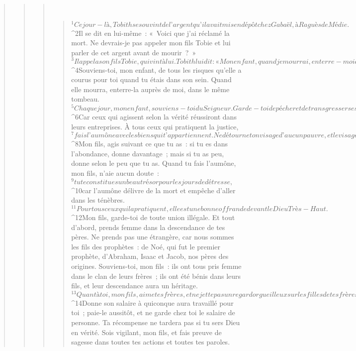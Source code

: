 \begin{verse}
\begin{verse}
\begin{verse}
         
      \bchapter{}
      \begin{verse}
${}^{1}Ce jour-là, Tobith se souvint de l’argent qu’il avait mis en dépôt chez Gabaël, à Raguès de Médie. 
${}^{2}Il se dit en lui-même : « Voici que j’ai réclamé la mort. Ne devrais-je pas appeler mon fils Tobie et lui parler de cet argent avant de mourir ? » 
${}^{3}Il appela son fils Tobie, qui vint à lui. Tobith lui dit : « Mon enfant, quand je mourrai, enterre-moi dignement. Honore ta mère et ne l’abandonne pas aussi longtemps qu’elle vivra. Fais ce qui lui est agréable et ne l’attriste en rien. 
${}^{4}Souviens-toi, mon enfant, de tous les risques qu’elle a courus pour toi quand tu étais dans son sein. Quand elle mourra, enterre-la auprès de moi, dans le même tombeau. 
${}^{5}Chaque jour, mon enfant, souviens-toi du Seigneur. Garde-toi de pécher et de transgresser ses commandements. Fais ce qui est juste tous les jours de ta vie et ne marche pas dans les voies de l’injustice. 
${}^{6}Car ceux qui agissent selon la vérité réussiront dans leurs entreprises. À tous ceux qui pratiquent la justice, 
${}^{7}fais l’aumône avec les biens qui t’appartiennent. Ne détourne ton visage d’aucun pauvre, et le visage de Dieu ne se détournera pas de toi.
${}^{8}Mon fils, agis suivant ce que tu as : si tu es dans l’abondance, donne davantage ; mais si tu as peu, donne selon le peu que tu as. Quand tu fais l’aumône, mon fils, n’aie aucun doute : 
${}^{9}tu te constitues un beau trésor pour les jours de détresse, 
${}^{10}car l’aumône délivre de la mort et empêche d’aller dans les ténèbres. 
${}^{11}Pour tous ceux qui la pratiquent, elle est une bonne offrande devant le Dieu Très-Haut. 
${}^{12}Mon fils, garde-toi de toute union illégale. Et tout d’abord, prends femme dans la descendance de tes pères. Ne prends pas une étrangère, car nous sommes les fils des prophètes : de Noé, qui fut le premier prophète, d’Abraham, Isaac et Jacob, nos pères des origines. Souviens-toi, mon fils : ils ont tous pris femme dans le clan de leurs frères ; ils ont été bénis dans leurs fils, et leur descendance aura un héritage. 
${}^{13}Quant à toi, mon fils, aime tes frères, et ne jette pas un regard orgueilleux sur les filles de tes frères. Car, dans l’orgueil, il y a ruine et grand désordre et, dans une conduite indigne, abaissement et indigence extrême : c’est le début de la misère.
${}^{14}Donne son salaire à quiconque aura travaillé pour toi ; paie-le aussitôt, et ne garde chez toi le salaire de personne. Ta récompense ne tardera pas si tu sers Dieu en vérité. Sois vigilant, mon fils, et fais preuve de sagesse dans toutes tes actions et toutes tes paroles. 

\end{verse}
\end{verse}
\end{verse}
\end{verse}
